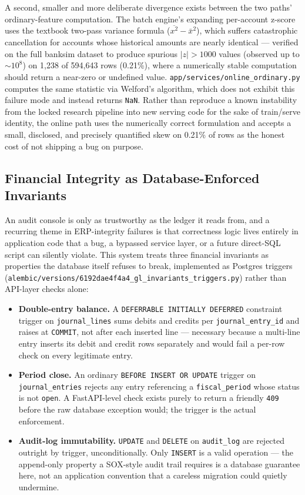A second, smaller and more deliberate divergence exists between the two paths' ordinary-feature computation. The batch engine's expanding per-account z-score uses the textbook two-pass variance formula ($\overline{x^2} - \bar{x}^2$), which suffers catastrophic cancellation for accounts whose historical amounts are nearly identical — verified on the full banksim dataset to produce spurious $|z|>1000$ values (observed up to $\sim\!10^8$) on 1{,}238 of 594{,}643 rows (0.21\%), where a numerically stable computation should return a near-zero or undefined value. \texttt{app/services/online\_ordinary.py} computes the same statistic via Welford's algorithm, which does not exhibit this failure mode and instead returns \texttt{NaN}. Rather than reproduce a known instability from the locked research pipeline into new serving code for the sake of train/serve identity, the online path uses the numerically correct formulation and accepts a small, disclosed, and precisely quantified skew on 0.21\% of rows as the honest cost of not shipping a bug on purpose.

\subsection{Financial Integrity as Database-Enforced Invariants}\label{sec:system-integrity}

An audit console is only as trustworthy as the ledger it reads from, and a recurring theme in ERP-integrity failures is that correctness logic lives entirely in application code that a bug, a bypassed service layer, or a future direct-SQL script can silently violate. This system treats three financial invariants as properties the database itself refuses to break, implemented as Postgres triggers (\texttt{alembic/versions/6192dae4f4a4\_gl\_invariants\_triggers.py}) rather than API-layer checks alone:

\begin{itemize}
  \item \textbf{Double-entry balance.} A \texttt{DEFERRABLE INITIALLY DEFERRED} constraint trigger on \texttt{journal\_lines} sums debits and credits per \texttt{journal\_entry\_id} and raises at \texttt{COMMIT}, not after each inserted line — necessary because a multi-line entry inserts its debit and credit rows separately and would fail a per-row check on every legitimate entry.
  \item \textbf{Period close.} An ordinary \texttt{BEFORE INSERT OR UPDATE} trigger on \texttt{journal\_entries} rejects any entry referencing a \texttt{fiscal\_period} whose status is not \texttt{open}. A FastAPI-level check exists purely to return a friendly \texttt{409} before the raw database exception would; the trigger is the actual enforcement.
  \item \textbf{Audit-log immutability.} \texttt{UPDATE} and \texttt{DELETE} on \texttt{audit\_log} are rejected outright by trigger, unconditionally. Only \texttt{INSERT} is a valid operation — the append-only property a SOX-style audit trail requires is a database guarantee here, not an application convention that a careless migration could quietly undermine.
\end{itemize}

